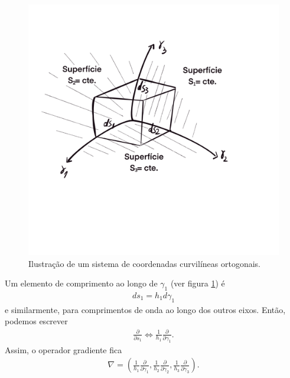 \begin{figure}
\vspace{-2cm}
\includegraphics[width=1\columnwidth]{./figuras/sist-curv-ort1}
\vspace{-5.5cm}
\caption{Ilustra\c{c}\~ao de um sistema de coordenadas curvil\'ineas ortogonais.}
\label{fig:coord-curv-ort}
\end{figure}
Um elemento de comprimento ao longo de $\gamma_{1}$ (ver figura \ref{fig:coord-curv-ort}) \'e
\begin{eqnarray}
ds_{1} = h_{1}d\gamma_{1}
\end{eqnarray}
e similarmente, para comprimentos de onda ao longo dos outros eixos. Ent\~ao, podemos escrever
\begin{eqnarray}
\frac{\partial}{\partial s_{1}} \Leftrightarrow
\frac{1}{h_{1}}\frac{\partial}{\partial\gamma_{1}}.
\end{eqnarray}
Assim, o operador gradiente fica
\begin{eqnarray}
\nabla = \left(
\frac{1}{h_{1}}\frac{\partial}{\partial\gamma_{1}},
\frac{1}{h_{2}}\frac{\partial}{\partial\gamma_{2}},
\frac{1}{h_{3}}\frac{\partial}{\partial\gamma_{3}}\right).
\end{eqnarray}

